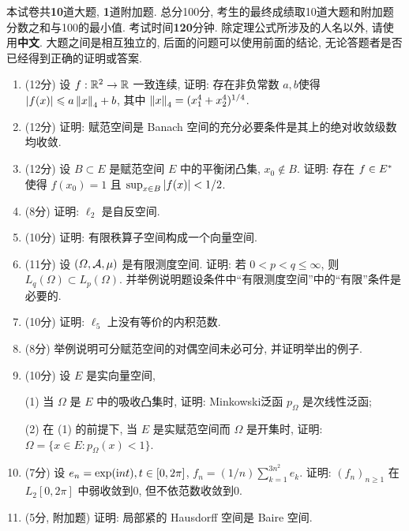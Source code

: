	本试卷共\textbf{10}道大题, \textbf{1}道附加题. 总分100分, 考生的最终成绩取10道大题和附加题分数之和与100的最小值. 考试时间\textbf{120}分钟. 除定理公式所涉及的人名以外, 请使用\textbf{中文}. 大题之间是相互独立的, 后面的问题可以使用前面的结论, 无论答题者是否已经得到正确的证明或答案.

\begin{enumerate}
	\item (12分) 设 $ f : \mathbb{R}^2\to \mathbb{R} $ 一致连续, 证明: 存在非负常数 $ a, b $使得 $ \left| f(x) \right| \leqslant a\left\| x \right\|_4+b $, 其中 $ \left\| x \right\|_4=(x_1^4+x_2^4)^{1/4} $.
	\item (12分) 证明: 赋范空间是 Banach 空间的充分必要条件是其上的绝对收敛级数均收敛.
	\item (12分) 设 $ B\subset E $ 是赋范空间 $ E $ 中的平衡闭凸集, $ x_0\notin B $. 证明: 存在 $ f\in E^{*} $ 使得 $ f(x_0)=1 $ 且 $ \sup_{x\in B}\left| f(x) \right| <1/2 $.
	\item (8分) 证明: $ \ell_2 $ 是自反空间.
	\item (10分) 证明: 有限秩算子空间构成一个向量空间.
	\item (11分) 设 $ (\varOmega,\mathcal{A},\mu) $ 是有限测度空间. 证明: 若 $ 0<p<q\leqslant\infty $, 则 $ L_q(\varOmega)\subset L_p(\varOmega) $. 并举例说明题设条件中``有限测度空间''中的``有限''条件是必要的.
	\item (10分) 证明: $ \ell_5 $ 上没有等价的内积范数.
	\item (8分) 举例说明可分赋范空间的对偶空间未必可分, 并证明举出的例子.
	\item (10分) 设 $ E $ 是实向量空间,
	
	\hspace{4em}(1) 当 $ \varOmega $ 是 $ E $ 中的吸收凸集时, 证明: Minkowski泛函 $ p_\varOmega $ 是次线性泛函;

	\hspace{4em}(2) 在 (1) 的前提下, 当 $ E $ 是实赋范空间而 $ \varOmega $ 是开集时, 证明: $ \varOmega=\{x\in E : p_\varOmega(x)<1\} $.

	\item (7分) 设 $ e_n=\exp(\mathrm{i} nt), t\in[0,2\pi] $, $ f_n=(1/n)\sum_{k=1}^{3n^2}e_k $. 证明: $ (f_n)_{n\geqslant 1} $ 在 $ L_2[0,2\pi] $ 中弱收敛到0, 但不依范数收敛到0.
	\item (5分, 附加题) 证明: 局部紧的 Hausdorff 空间是 Baire 空间.
\end{enumerate}
